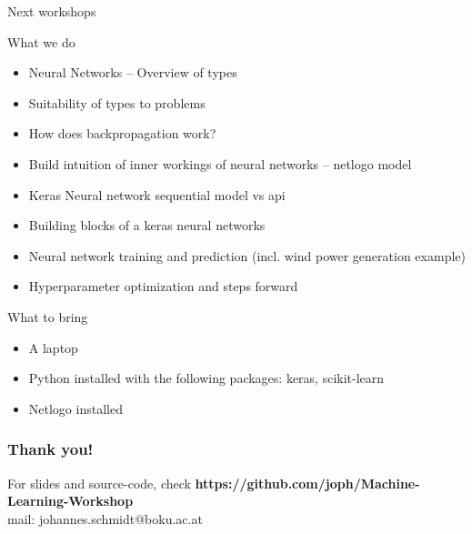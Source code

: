 \documentclass[color=usenames,dvipsnames]{beamer}
\begin{document}
\begin{frame}{Next workshops} 

What we do
\begin{itemize}

\item Neural Networks – Overview of types
\item Suitability of types to problems
\item How does backpropagation work?
\item Build intuition of inner workings of neural networks – netlogo model
\item Keras Neural network sequential model vs api
\item Building blocks of a keras neural networks
\item Neural network training and prediction (incl. wind power generation example)
\item Hyperparameter optimization and steps forward
\end{itemize}

What to bring
\begin{itemize}
\item A laptop
\item Python installed with the following packages: keras, scikit-learn
\item Netlogo installed
\end{itemize}

\end{frame}

{


\begin{frame}
\frametitle{Thank you!}
\begin{block}{
For slides and source-code, check \textbf{https://github.com/joph/Machine-Learning-Workshop}\\
mail: johannes.schmidt@boku.ac.at\\

}
\end{block}

\vspace{2.5 cm}


\end{frame}

}
\end{document}
